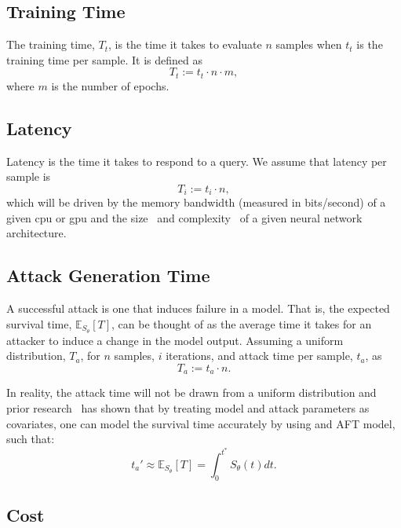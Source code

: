 \documentclass[sn-mathphys-num]{sn-jnl}%
\begin{document}
\subsection{Training Time}

The training time, $T_t$, is the time it takes to evaluate $n$ samples when $t_t$ is the training time per sample. It is defined as
\[
    T_t := t_t \cdot n  \cdot m,
\]
where $m$ is the number of epochs.


\subsection{Latency}

Latency is the time it takes to respond to a query. We assume that latency per sample is
\[
    T_i := t_i \cdot n,
\]
which will be driven by the memory bandwidth (measured in bits/second) of a given \acrshort{cpu} or \acrshort{gpu} and the size~\cite{vgg} and complexity~\cite{resnet} of a given neural network architecture.


\subsection{Attack Generation Time}
A successful attack is one that induces failure in a model. That is, the expected survival time, $\mathbb{E}_{S_\theta}[T]$, can be thought of as the average time it takes for an attacker to induce a change in the model output. Assuming a uniform distribution, $T_a$, for $n$ samples, $i$ iterations, and attack time per sample, $t_a$, as
\begin{equation}
    T_a := t_a \cdot n.
    \label{eq:attack_time}
\end{equation}

In reality, the attack time will not be drawn from a uniform distribution and prior research~\cite{meyers_aft} has shown that by treating model and attack parameters as covariates, one can model the survival time accurately by using and AFT model, such that:
\begin{equation}
	t_{a}' \approx \mathbb{E}_{S_\theta}[T] =  \int_{0}^{t^*} S_{\theta}(t) dt.
    \label{eq:aft_time}
\end{equation}



\subsection{Cost}
\end{document}
